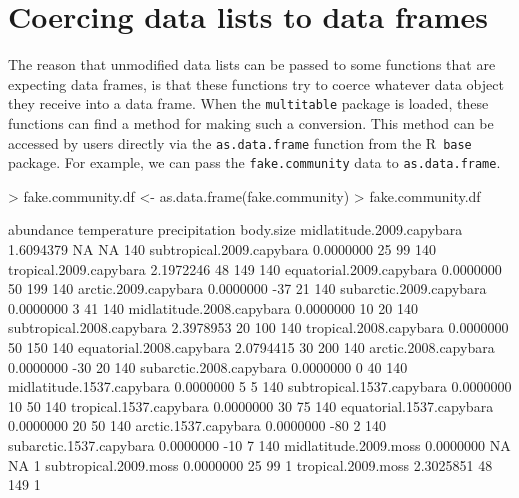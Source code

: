 \documentclass{article}
\newcommand{\R}{{\sf R}}
\newcommand{\code}[1]{\texttt{#1}}
\numberwithin{exercise}{section}
\begin{document}
\section{Coercing data lists to data frames}


The reason that unmodified data lists can be passed to some functions that are expecting data frames, is that these functions try to coerce whatever data object they receive into a data frame.  When the \code{multitable} package is loaded, these functions can find a method for making such a conversion.  This method can be accessed by users directly via the \code{as.data.frame} function from the \R\ \code{base} package.  For example, we can pass the \code{fake.community} data to \code{as.data.frame}.
\begin{Schunk}
\begin{Sinput}
> fake.community.df <- as.data.frame(fake.community)
> fake.community.df
\end{Sinput}
\begin{Soutput}
                          abundance temperature precipitation body.size
midlatitude.2009.capybara 1.6094379          NA            NA       140
subtropical.2009.capybara 0.0000000          25            99       140
tropical.2009.capybara    2.1972246          48           149       140
equatorial.2009.capybara  0.0000000          50           199       140
arctic.2009.capybara      0.0000000         -37            21       140
subarctic.2009.capybara   0.0000000           3            41       140
midlatitude.2008.capybara 0.0000000          10            20       140
subtropical.2008.capybara 2.3978953          20           100       140
tropical.2008.capybara    0.0000000          50           150       140
equatorial.2008.capybara  2.0794415          30           200       140
arctic.2008.capybara      0.0000000         -30            20       140
subarctic.2008.capybara   0.0000000           0            40       140
midlatitude.1537.capybara 0.0000000           5             5       140
subtropical.1537.capybara 0.0000000          10            50       140
tropical.1537.capybara    0.0000000          30            75       140
equatorial.1537.capybara  0.0000000          20            50       140
arctic.1537.capybara      0.0000000         -80             2       140
subarctic.1537.capybara   0.0000000         -10             7       140
midlatitude.2009.moss     0.0000000          NA            NA         1
subtropical.2009.moss     0.0000000          25            99         1
tropical.2009.moss        2.3025851          48           149         1

\end{Soutput}
\end{Schunk}
\end{document}
